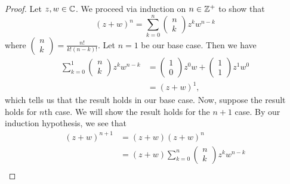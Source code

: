 \documentclass[a4paper]{article}
\begin{document}
        \begin{proof}
        Let \( z,w \in \mathbb{C}  \). We proceed via induction on \( n \in \mathbb{Z}^{+}  \) to show that 
                \[  (z + w)^{n} = \sum_{ k=  0  }^{  n  } \begin{pmatrix} 
                           n \\
                           k 
                          \end{pmatrix} z^{k} w^{n-k}    \]
                          where \( \begin{pmatrix} 
                                     n \\
                                     k 
                                    \end{pmatrix}  = \frac{ n!  }{ k! (n-k)! }. \)
        Let \( n =1  \) be our base case. Then we have  
        \begin{align*}
            \sum_{ k=0  }^{ 1 } \begin{pmatrix} 
                       n \\
                       k 
                      \end{pmatrix} z^{k } w^{n-k} &= \begin{pmatrix} 
                                1 \\ 
                                0 
                                \end{pmatrix} z^{0} w + \begin{pmatrix} 
                                           1 \\
                                           1
                                          \end{pmatrix} z^{1} w^{0}  \\
                                          &= (z + w)^{1},
        \end{align*}
        which tells us that the result holds in our base case. Now, suppose the result holds for \( n  \)th case. We will show the result holds for the \( n + 1  \) case. By our induction hypothesis, we see that
        \begin{align*}
            (z+w)^{n+1} &= (z+w) (z+w)^{n} \\
                        &= (z+w) \sum_{ k=0  }^{ n } \begin{pmatrix} 
                                   n \\
                                   k 
                                  \end{pmatrix} z^{k} w^{n-k} \\

\end{align*}
\end{proof}
\end{document}
